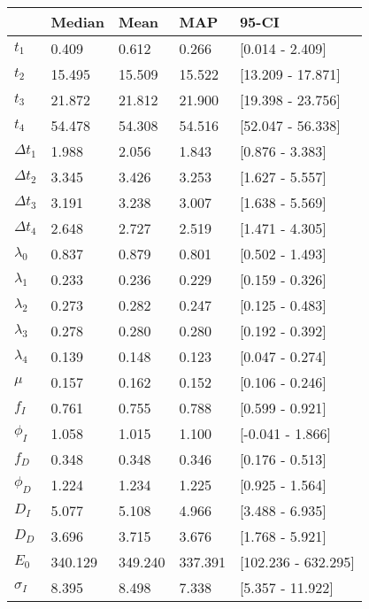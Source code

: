 \begin{tabular}{lllll}
\toprule
{} &   Median &     Mean &      MAP &                95-CI \\
\midrule
$t_1$        &    0.409 &    0.612 &    0.266 &      [0.014 - 2.409] \\
$t_2$        &   15.495 &   15.509 &   15.522 &    [13.209 - 17.871] \\
$t_3$        &   21.872 &   21.812 &   21.900 &    [19.398 - 23.756] \\
$t_4$        &   54.478 &   54.308 &   54.516 &    [52.047 - 56.338] \\
$\Delta t_1$ &    1.988 &    2.056 &    1.843 &      [0.876 - 3.383] \\
$\Delta t_2$ &    3.345 &    3.426 &    3.253 &      [1.627 - 5.557] \\
$\Delta t_3$ &    3.191 &    3.238 &    3.007 &      [1.638 - 5.569] \\
$\Delta t_4$ &    2.648 &    2.727 &    2.519 &      [1.471 - 4.305] \\
$\lambda_0$  &    0.837 &    0.879 &    0.801 &      [0.502 - 1.493] \\
$\lambda_1$  &    0.233 &    0.236 &    0.229 &      [0.159 - 0.326] \\
$\lambda_2$  &    0.273 &    0.282 &    0.247 &      [0.125 - 0.483] \\
$\lambda_3$  &    0.278 &    0.280 &    0.280 &      [0.192 - 0.392] \\
$\lambda_4$  &    0.139 &    0.148 &    0.123 &      [0.047 - 0.274] \\
$\mu$        &    0.157 &    0.162 &    0.152 &      [0.106 - 0.246] \\
$f_I$        &    0.761 &    0.755 &    0.788 &      [0.599 - 0.921] \\
$\phi_I$     &    1.058 &    1.015 &    1.100 &     [-0.041 - 1.866] \\
$f_D$        &    0.348 &    0.348 &    0.346 &      [0.176 - 0.513] \\
$\phi_D$     &    1.224 &    1.234 &    1.225 &      [0.925 - 1.564] \\
$D_I$        &    5.077 &    5.108 &    4.966 &      [3.488 - 6.935] \\
$D_D$        &    3.696 &    3.715 &    3.676 &      [1.768 - 5.921] \\
$E_0$        &  340.129 &  349.240 &  337.391 &  [102.236 - 632.295] \\
$\sigma_I$   &    8.395 &    8.498 &    7.338 &     [5.357 - 11.922] \\

\end{tabular}
